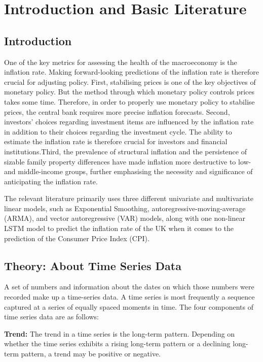 \chapter{Introduction and Basic Literature}

\section{Introduction}
\hspace{10mm}One of the key metrics for assessing the health of the macroeconomy is the inflation rate. Making forward-looking predictions of the inflation rate is therefore crucial for adjusting policy. First, stabilising prices is one of the key objectives of monetary policy. But the method through which monetary policy controls prices takes some time. Therefore, in order to properly use monetary policy to stabilise prices, the central bank requires more precise inflation forecasts. Second, investors' choices regarding investment items are influenced by the inflation rate in addition to their choices regarding the investment cycle. The ability to estimate the inflation rate is therefore crucial for investors and financial institutions.Third, the prevalence of structural inflation and the persistence of sizable family property differences have made inflation more destructive to low- and middle-income groups, further emphasising the necessity and significance of anticipating the inflation rate.

The relevant literature primarily uses three different univariate and multivariate linear models, such as Exponential Smoothing, autoregressive-moving-average (ARMA), and vector autoregressive (VAR) models, along with one non-linear LSTM model to predict the inflation rate of the UK when it comes to the prediction of the Consumer Price Index (CPI).


\section{Theory: About Time Series Data}

\hspace{10mm}A set of numbers and information about the dates on which those numbers were recorded make up a time-series data. A time series is most frequently a sequence captured at a series of equally spaced moments in time. The four components of time series data are as follows:

\textbf{Trend:} The trend in a time series is the long-term pattern. Depending on whether the time series exhibits a rising long-term pattern or a declining long-term pattern, a trend may be positive or negative.

